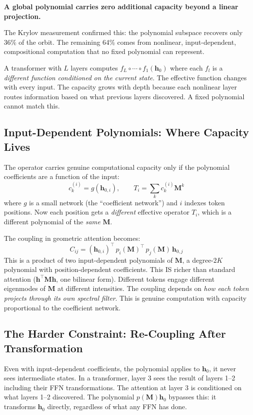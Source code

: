 \documentclass[11pt, a4paper]{article}
\newcommand{\M}{\mathbf{M}}
\newcommand{\h}{\mathbf{h}}
\theoremstyle{plain}
\theoremstyle{definition}
\theoremstyle{remark}
\begin{document}
\textbf{A global polynomial carries zero additional capacity beyond a linear projection.}

The Krylov measurement confirmed this: the polynomial subspace recovers only 36\% of the orbit.
The remaining 64\% comes from nonlinear, input-dependent, compositional computation that no fixed polynomial can represent.

A transformer with $L$ layers computes $f_L \circ \cdots \circ f_1(\h_0)$ where each $f_l$ is a \emph{different function conditioned on the current state}.
The effective function changes with every input.
The capacity grows with depth because each nonlinear layer routes information based on what previous layers discovered.
A fixed polynomial cannot match this.

\subsection{Input-Dependent Polynomials: Where Capacity Lives}

The operator carries genuine computational capacity only if the polynomial coefficients are a function of the input:
\begin{equation}
c_k^{(i)} = g(\h_{0,i}), \qquad
T_i = \sum_k c_k^{(i)} \M^k
\end{equation}
where $g$ is a small network (the ``coefficient network'') and $i$ indexes token positions.
Now each position gets a \emph{different} effective operator $T_i$, which is a different polynomial of the \emph{same} $\M$.

The coupling in geometric attention becomes:
\begin{equation}
C_{ij} = (\h_{0,i})^\top \, p_i(\M)^\top \, p_j(\M) \, \h_{0,j}
\end{equation}
This is a product of two input-dependent polynomials of $\M$, a degree-$2K$ polynomial with position-dependent coefficients.
This IS richer than standard attention ($\h^\top \M \h$, one bilinear form).
Different tokens engage different eigenmodes of $\M$ at different intensities.
The coupling depends on \emph{how each token projects through its own spectral filter}.
This is genuine computation with capacity proportional to the coefficient network.

\subsection{The Harder Constraint: Re-Coupling After Transformation}

Even with input-dependent coefficients, the polynomial applies to $\h_0$, it never sees intermediate states.
In a transformer, layer 3 sees the result of layers 1--2 including their FFN transformations.
The attention at layer 3 is conditioned on what layers 1--2 discovered.
The polynomial $p(\M) \h_0$ bypasses this: it transforms $\h_0$ directly, regardless of what any FFN has done.
\end{document}
